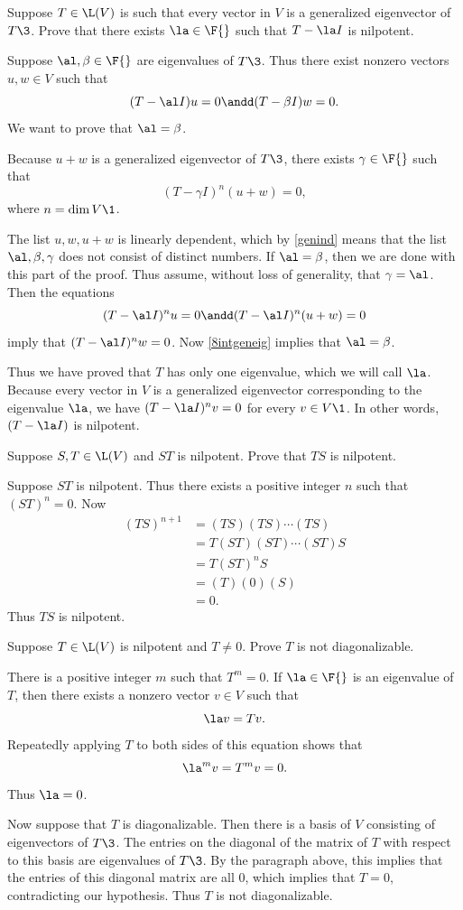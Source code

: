 \exercise
Suppose $T \in \L(V)$ is such that every vector in $V$ is a generalized eigenvector of $T\3$. Prove that there exists $\la \in \F{}$ such that
$T - \la I$ is nilpotent.

\begin{Solution}
Suppose $\al, \beta \in \F{}$ are eigenvalues of $T\3$. Thus there exist nonzero vectors $u, w \in V$ such that
\[
(T - \al I)u = 0 \andd (T - \beta I)w = 0.
\]
We want to prove that $\al = \beta$.

Because $u+w$ is a generalized eigenvector of $T\3$, there exists $\gamma \in \F{}$ such that
\[
(T - \gamma I)^n (u+w) = 0,
\]
where $n = \dim V\1$.

The list $u, w, u+w$ is linearly dependent, which by \ref{genind} means that the list $\al, \beta, \gamma$ does not consist of distinct numbers. If $\al = \beta$, then we are done with this part of the proof. Thus assume, without loss of generality, that $\gamma = \al$. Then the equations
\[
(T - \al I)^n u = 0 \andd (T - \al I)^n (u+w) = 0
\]
imply that $(T - \al I)^n w = 0$. Now \ref{8intgeneig} implies that $\al = \beta$.

Thus we have proved that $T$ has only one eigenvalue, which we will call $\la$. Because every vector in $V$ is a generalized eigenvector corresponding to the eigenvalue $\la$, we have $(T - \la I)^n v = 0$ for every $v \in V\1$. In other words, $(T - \la I)$ is nilpotent.
\end{Solution}

\exercise
Suppose $S, T \in \L(V)$ and $ST$ is nilpotent. Prove that $TS$ is nilpotent.

\begin{Solution}
Suppose $ST$ is nilpotent.  Thus there exists a positive integer $n$ such that
$(ST)^n = 0$.  Now
\begin{align*}
(TS)^{n+1} &= (TS)(TS) \dotsm (TS) \\
&= T(ST)(ST)\dotsm (ST) S \\
&= T(ST)^n S \\
&= (T)(0)(S) \\
&= 0.
\end{align*}
Thus $TS$ is nilpotent.
\end{Solution}

\exercise
Suppose $T \in \L(V)$ is nilpotent and $T \ne 0$. Prove $T$ is not diagonalizable.

\begin{Solution}
There is a positive integer $m$ such that $T^m = 0$. If $\la \in \F{}$ is an eigenvalue of $T$, then there exists a nonzero vector $v \in V$ such that
\[
\la v = Tv.
\]
Repeatedly applying $T$ to both sides of this equation shows that
\[
\la^m v = T^m v = 0.
\]
Thus $\la = 0$.

Now suppose that $T$ is diagonalizable. Then there is a basis of $V$ consisting of eigenvectors of $T\3$. The entries on the diagonal of the matrix of $T$ with respect to this basis are eigenvalues of $T\3$. By the paragraph above, this implies that the entries of this diagonal matrix are all $0$, which implies that $T = 0$, contradicting our hypothesis. Thus $T$ is not diagonalizable.
\end{Solution}

